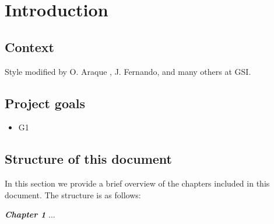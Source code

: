 \chapter{Introduction}

\section{Context}

Style modified by O. Araque \cite{oaraque}, J. Fernando\cite{jfernando}, and many others at GSI.

\section{Project goals}


\begin{itemize}


\item  G1

\end{itemize}

\section{Structure of this document}
In this section we provide a brief overview of the chapters included in this document. The structure is as follows:

\textbf{\textit{Chapter 1}} ...